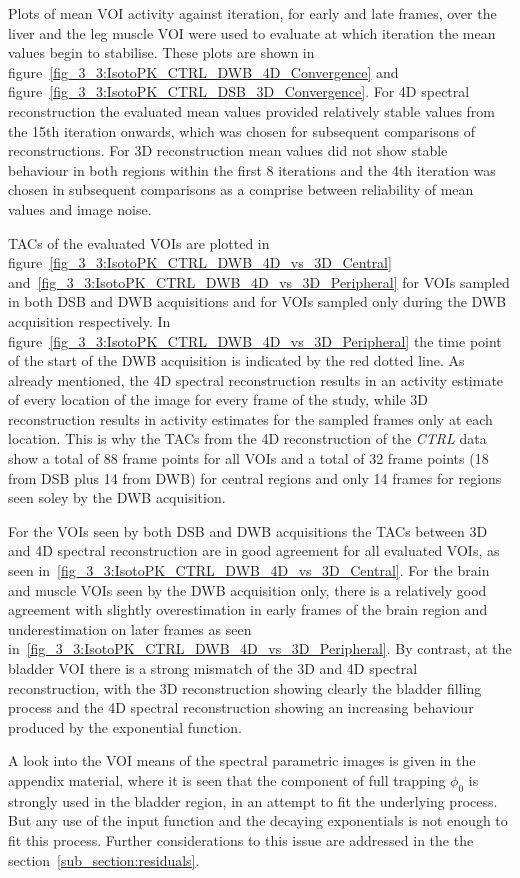 Plots of mean VOI activity against iteration, for early and late frames, over the liver and the leg muscle VOI were used to evaluate at which iteration the mean values begin to stabilise. These plots are shown in figure~\ref{fig_3_3:IsotoPK_CTRL_DWB_4D_Convergence} and figure~\ref{fig_3_3:IsotoPK_CTRL_DSB_3D_Convergence}. For 4D spectral reconstruction the evaluated mean values provided relatively stable values from the 15th iteration onwards, which was chosen for subsequent comparisons of reconstructions. For 3D reconstruction mean values did not show stable behaviour in both regions within the first 8 iterations and the 4th iteration was chosen in subsequent comparisons as a comprise between reliability of mean values and image noise.  



TACs of the evaluated VOIs are plotted in figure~\ref{fig_3_3:IsotoPK_CTRL_DWB_4D_vs_3D_Central} and~\ref{fig_3_3:IsotoPK_CTRL_DWB_4D_vs_3D_Peripheral} for VOIs sampled in both DSB and DWB acquisitions and for VOIs sampled only during the DWB acquisition respectively. In figure~\ref{fig_3_3:IsotoPK_CTRL_DWB_4D_vs_3D_Peripheral} the time point of the start of the DWB acquisition is indicated by the red dotted line.
As already mentioned, the 4D spectral reconstruction results in an activity estimate of every location of the image for every frame of the study, while 3D reconstruction results in activity estimates for the sampled frames only at each location. This is why the TACs from the 4D reconstruction of the \textit{CTRL} data show a total of 88 frame points for all VOIs and a total of 32 frame points (18 from DSB plus 14 from DWB) for central regions and only 14 frames for regions seen soley by the DWB acquisition. 

For the VOIs seen by both DSB and DWB acquisitions the TACs between 3D and 4D spectral reconstruction are in good agreement for all evaluated VOIs, as seen in~\ref{fig_3_3:IsotoPK_CTRL_DWB_4D_vs_3D_Central}. For the brain and muscle VOIs seen by the DWB acquisition only, there is a relatively good agreement with slightly overestimation in early frames of the brain region and underestimation on later frames as seen in~\ref{fig_3_3:IsotoPK_CTRL_DWB_4D_vs_3D_Peripheral}. By contrast, at the bladder VOI there is a strong mismatch of the 3D and 4D spectral reconstruction, with the 3D reconstruction showing clearly the bladder filling process and the 4D spectral reconstruction showing an increasing behaviour produced by the exponential function. 

A look into the VOI means of the spectral parametric images is given in the appendix material, where it is seen that the component of full trapping $\phi_0$ is strongly used in the bladder region, in an attempt to fit the underlying process. But any use of the input function and the decaying exponentials is not enough to fit this process. Further considerations to this issue are addressed in the the section~\ref{sub_section:residuals}. 

